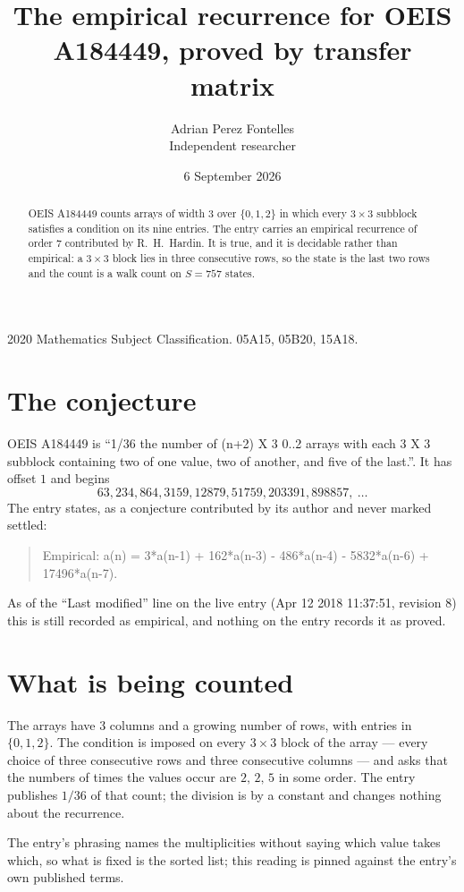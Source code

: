 \documentclass[11pt,a4paper]{article}
\title{The empirical recurrence for OEIS A184449, proved by transfer matrix}
\author{Adrian Perez Fontelles\\ \small Independent researcher}
\date{6 September 2026}
\theoremstyle{plain}
\theoremstyle{definition}
\begin{document}
\maketitle

\begin{abstract}
OEIS A184449 counts arrays of width $3$ over $\{0,1,2\}$ in which every $3\times3$ subblock
satisfies a condition on its nine entries. The entry carries an empirical recurrence of order
$7$ contributed by R.~H.~Hardin. It is true, and it is decidable rather than empirical: a
$3\times3$ block lies in three consecutive rows, so the state is the last two rows and the
count is a walk count on $S=757$ states.
\end{abstract}

\noindent\small 2020 Mathematics Subject Classification. 05A15, 05B20, 15A18.\normalsize

\section{The conjecture}

OEIS A184449 is ``1/36 the number of (n+2) X 3 0..2 arrays with each 3 X 3 subblock containing two of one value, two of another, and five of the last.''. It has offset $1$ and begins
\[
63, 234, 864, 3159, 12879, 51759, 203391, 898857,\ \dots
\]
The entry states, as a conjecture contributed by its author and never marked settled:
\begin{quote}
Empirical: a(n) = 3*a(n-1) + 162*a(n-3) - 486*a(n-4) - 5832*a(n-6) + 17496*a(n-7).
\end{quote}
As of the ``Last modified'' line on the live entry (Apr 12 2018 11:37:51, revision 8) this is still
recorded as empirical, and nothing on the entry records it as proved.

\section{What is being counted}

The arrays have $3$ columns and a growing number of rows, with entries in $\{0,1,2\}$. The
condition is imposed on every $3\times3$ block of the array --- every choice of three
consecutive rows and three consecutive columns --- and asks that the numbers of times the values occur are $2,\,2,\,5$ in some order. The entry publishes $1/36$ of that count; the division is by a constant and changes nothing about the recurrence.

The entry's phrasing names the multiplicities without saying which value takes which, so what is fixed is the sorted list; this reading is pinned against the entry's own published terms.
\end{document}
